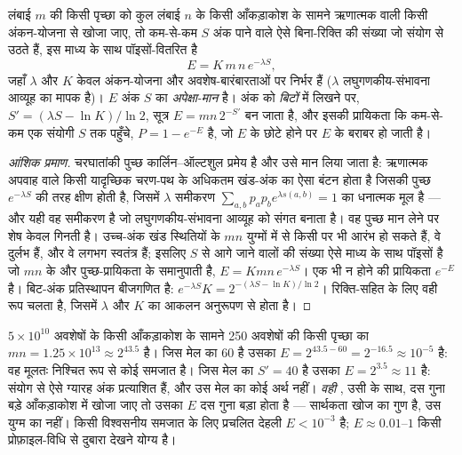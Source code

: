 \begin{theorem}[किसी यादृच्छिक मेल की सांख्यिकी]\label{thm:b3:bioinformatics:evalue}
लंबाई $m$ की किसी पृच्छा को कुल लंबाई $n$ के किसी आँकड़ाकोश के सामने
ऋणात्मक  वाली किसी अंकन-योजना से खोजा जाए, तो कम-से-कम
$S$ अंक पाने वाले ऐसे बिना-रिक्ति  की संख्या जो संयोग से
उठते हैं, इस माध्य के साथ पॉइसों-वितरित है
\[
E = K\,m\,n\,e^{-\lambda S},
\]
जहाँ $\lambda$ और $K$ केवल अंकन-योजना और अवशेष-बारंबारताओं पर निर्भर
हैं ($\lambda$ लघुगणकीय-संभावना आव्यूह का मापक है)।
$E$ अंक $S$ का \emph{अपेक्षा-मान} है। अंक को
\emph{बिटों} में लिखने पर, $S' = (\lambda S - \ln K)/\ln 2$, सूत्र
$E = m n\, 2^{-S'}$ बन जाता है, और इसकी प्रायिकता कि कम-से-कम एक संयोगी
 $S$ तक पहुँचे, $P = 1 - e^{-E}$ है, जो $E$ के छोटे होने पर $E$
के बराबर हो जाती है।
\end{theorem}
\begin{proof}[आंशिक प्रमाण]
चरघातांकी पुच्छ कार्लिन--ऑल्टशुल प्रमेय है और उसे मान लिया जाता है:
ऋणात्मक अपवाह वाले किसी यादृच्छिक चरण-पथ के अधिकतम खंड-अंक का ऐसा
बंटन होता है जिसकी पुच्छ $e^{-\lambda S}$ की तरह क्षीण होती है, जिसमें
$\lambda$ समीकरण $\sum_{a,b} p_{a} p_{b} e^{\lambda s(a,b)} = 1$ का
धनात्मक मूल है --- और यही वह समीकरण है जो लघुगणकीय-संभावना आव्यूह को
संगत बनाता है। वह पुच्छ मान लेने पर शेष केवल गिनती है। उच्च-अंक खंड
स्थितियों के $mn$ युग्मों में से किसी पर भी आरंभ हो सकते हैं, वे दुर्लभ
हैं, और वे लगभग स्वतंत्र हैं; इसलिए $S$ से आगे जाने वालों की संख्या ऐसे
माध्य के साथ पॉइसों है जो $mn$ के और पुच्छ-प्रायिकता के समानुपाती है,
$E = Kmn\,e^{-\lambda S}$। एक भी न होने की प्रायिकता $e^{-E}$ है।
बिट-अंक प्रतिस्थापन बीजगणित है: $e^{-\lambda S} K = 2^{-(\lambda S -
\ln K)/\ln 2}$। रिक्ति-सहित  के लिए वही रूप चलता है, जिसमें $\lambda$
और $K$ का आकलन अनुरूपण से होता है।
\end{proof}

\begin{example}[कोई E-मान पढ़ना]\label{ex:b3:bioinformatics:evalue}
$5\times 10^{10}$ अवशेषों के किसी आँकड़ाकोश के सामने \num{250} अवशेषों
की किसी पृच्छा का $mn = 1.25\times 10^{13} \approx 2^{43.5}$ है। जिस मेल
का  $60$ है उसका $E = 2^{43.5 - 60} = 2^{-16.5} \approx 10^{-5}$ है:
वह मूलतः निश्चित रूप से कोई समजात है। जिस मेल का $S' = 40$ है उसका $E = 2^{3.5}
\approx 11$ है: संयोग से ऐसे ग्यारह अंक प्रत्याशित हैं, और उस मेल का
कोई अर्थ नहीं। \emph{वही} , उसी  के साथ, दस गुना बड़े
आँकड़ाकोश में खोजा जाए तो उसका $E$ दस गुना बड़ा होता है --- सार्थकता
खोज का गुण है, उस युग्म का नहीं।
किसी विश्वसनीय समजात के लिए प्रचलित देहली $E < 10^{-3}$ है;
$E \approx 0.01$--$1$ किसी प्रोफ़ाइल-विधि से दुबारा देखने योग्य है।
\end{example}


